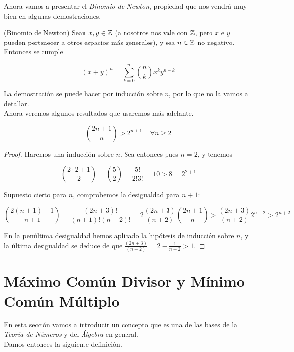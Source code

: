 Ahora vamos a presentar el \textit{Binomio de Newton}, propiedad que nos vendrá muy bien en algunas demostraciones.

\begin{teorema}{(Binomio de Newton)}\label{binomio_de_newton}
	Sean $x, y \in \mathbb{Z}$ (a nosotros nos vale con $\mathbb{Z}$, pero $x$ e $y$ pueden pertenecer a otros espacios más generales), y sea $n \in \mathbb{Z}$ no negativo. Entonces se cumple
	
	\[ (x + y)^n = \sum_{k=0}^{n}\binom{n}{k}x^ky^{n-k} \]
\end{teorema}

La demostración se puede hacer por inducción sobre $n$, por lo que no la vamos a detallar.\\

Ahora veremos algunos resultados que usaremos más adelante.

\begin{lema}\label{binomio_cota_inferior_2n}
	\begin{equation}
	\binom{2n + 1}{n} > 2^{n+1}\;\;\;\;\forall n \geq 2
	\end{equation}
\end{lema}

\begin{proof}
	Haremos una inducción sobre $n$. Sea entonces pues $n=2$, y tenemos
	
	\[ \binom{2\cdot2 + 1}{2} = \binom{5}{2} = \frac{5!}{2!3!} = 10 > 8 = 2^{2+1} \]
	
	Supuesto cierto para $n$, comprobemos la desigualdad para $n+1$:
	
	\[ \binom{2(n+1) + 1}{n+1} = \frac{(2n+3)!}{(n+1)!(n+2)!} = 2\frac{(2n+3)}{(n+2)}\binom{2n+1}{n} > \frac{(2n+3)}{(n+2)}2^{n+2} > 2^{n+2} \]
	
	En la penúltima desigualdad hemos aplicado la hipótesis de inducción sobre $n$, y la última desigualdad se deduce de que $\frac{(2n+3)}{(n+2)} = 2 - \frac{1}{n+2} > 1$.
\end{proof}

\section{Máximo Común Divisor y Mínimo Común Múltiplo}

En esta sección vamos a introducir un concepto que es una de las bases de la \textit{Teoría de Números} y del \textit{Álgebra} en general.\\

Damos entonces la siguiente definición.

